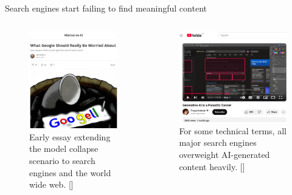 \documentclass[10pt]{beamer}
\newcommand{\citeme}[1]{{\xspace\color{scAqua} \scriptsize [\cite{#1}]}}
\begin{document}
\begin{frame}{Search engines start failing to find meaningful content}
	\begin{columns}[T,onlytextwidth]
		\hspace*{-0.7cm} 
		\begin{figure}
			\includegraphics[width=\textwidth]{figures/marcusg-google.png}
			\caption{Early essay extending the model collapse scenario to search engines and the world wide web.\citeme{Marcus2023}}
		\end{figure}
		
		\begin{figure}
			\includegraphics[width=1.17\textwidth]{figures/holmer-parasiticcancer.png}
			\caption{For some technical terms, all major search engines overweight AI-generated content heavily.\citeme{Holmer2025}}
		\end{figure}
		

\end{columns}
\end{frame}
\end{document}
